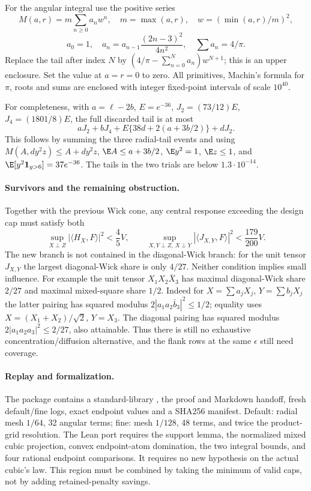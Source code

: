 For the angular integral use the positive series
\[
 M(a,r)=m\sum_{n\ge0}a_n w^n,\quad
 m=\max(a,r),\quad w=(\min(a,r)/m)^2,
\]
\[
 a_0=1,\quad a_n=a_{n-1}\frac{(2n-3)^2}{4n^2},\quad
 \sum a_n=4/\pi.
\]
Replace the tail after index $N$ by
$(4/\pi-\sum_{n=0}^Na_n)w^{N+1}$; this is an upper enclosure.
Set the value at $a=r=0$ to zero.
All primitives, Machin's formula for $\pi$, roots and sums are enclosed
with integer fixed-point intervals of scale $10^{40}$.

For completeness, with $a=\ell-2b$, $E=e^{-36}$,
$J_2=(73/12)E$, $J_4=(1801/8)E$, the full discarded tail is at most
\[
 aJ_2+bJ_4+E\{38d+2(a+3b/2)\}+dJ_2.
\]
This follows by summing the three radial-tail events and using
$M(A,d y^2z)\le A+d y^2z$,
$\E A\le a+3b/2$, $\E y^2=1$, $\E z\le1$,
and $\E[y^2\mathbf1_{y>6}]=37e^{-36}$.
The tails in the two trials are below $1.3\cdot10^{-14}$.

\paragraph{Survivors and the remaining obstruction.}
Together with the previous Wick cone, any central response exceeding
the design cap must satisfy both
\[
 \sup_{X\perp Z}|\langle H_X,F\rangle|^2<\frac45V,
 \qquad
 \sup_{X,Y\perp Z,\,X\perp Y}|\langle J_{X,Y},F\rangle|^2
                  <\frac{179}{200}V.
\]
The new branch is not contained in the diagonal-Wick branch:
for the unit tensor $J_{X,Y}$ the largest diagonal-Wick share is only
$4/27$. Neither condition implies small influence. For example the
unit tensor $X_1X_2\bar X_3$ has maximal diagonal-Wick share $2/27$
and maximal mixed-square share $1/2$.
Indeed for $X=\sum a_jX_j$, $Y=\sum b_jX_j$ the latter pairing has
squared modulus $2|a_1a_2\bar b_3|^2\le1/2$; equality uses
$X=(X_1+X_2)/\sqrt2$, $Y=X_3$.
The diagonal pairing has squared modulus
$2|a_1a_2a_3|^2\le2/27$, also attainable.
Thus there is still no exhaustive concentration/diffusion alternative,
and the flank rows at the same $\epsilon$ still need coverage.

\paragraph{Replay and formalization.}
The package  contains a
standard-library , the proof and Markdown handoff,
fresh default/fine logs, exact endpoint values and a SHA256 manifest.
Default: radial mesh $1/64$, 32 angular terms; fine: mesh $1/128$,
48 terms, and twice the product-grid resolution.
The Lean port requires the support lemma, the normalized mixed cubic
projection, convex endpoint-atom domination, the two integral bounds,
and four rational endpoint comparisons. It requires no new hypothesis
on the actual cubic's law. This region must be combined by taking the
minimum of valid caps, not by adding retained-penalty savings.
